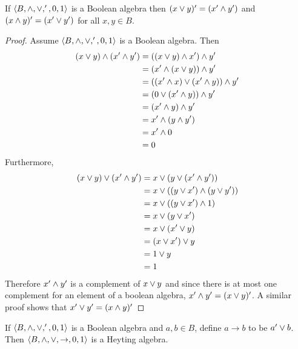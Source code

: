 \begin{theorem*}
If $\langle B, \wedge, \vee, ', 0 , 1\rangle$ is a Boolean algebra then $(x \vee y)' = (x' \wedge y')$ and $(x \wedge y)' = (x' \vee y')$ for all $x, y\in B$.
\end{theorem*}
\begin{proof}
Assume $\langle B, \wedge, \vee, ', 0 , 1\rangle$ is a Boolean algebra.
Then
\begin{align*}
(x\vee y) \wedge (x' \wedge y') &= ((x\vee y) \wedge x') \wedge y' \\
                               &= (x' \wedge  (x\vee y)) \wedge y' \\
                               &= ((x' \wedge x) \vee (x' \wedge y)) \wedge y' \\
                               &= (0 \vee (x' \wedge y)) \wedge y' \\
                               &= (x' \wedge y) \wedge y' \\
                               &= x' \wedge (y \wedge y') \\
                               &= x' \wedge 0 \\
                               &= 0 
\end{align*}
Furthermore,
\begin{align*}
(x\vee y) \vee (x' \wedge y') &= x\vee (y \vee (x' \wedge y')) \\
                               &= x\vee ((y \vee x') \wedge (y \vee y')) \\
                               &= x\vee ((y \vee x') \wedge 1) \\
                               &= x\vee (y \vee x') \\
                               &= x\vee (x' \vee y) \\
                               &= (x\vee x') \vee y \\
                               &= 1 \vee y \\
                               &= 1
\end{align*}
Therefore $x' \wedge y'$ is a complement of $x\vee y$ and since there is at most one complement for an element of a boolean algebra, $x' \wedge y' = (x\vee y)'$. A similar proof shows that $x' \vee y' = (x\wedge y)'$
\end{proof}

\begin{theorem*}
If $\langle B, \wedge, \vee, ', 0 , 1\rangle$ is a Boolean algebra and $a, b \in B$, define $a\to b$ to be $a'\vee b$.
Then $\langle B, \wedge, \vee, \to, 0, 1\rangle$ is a Heyting algebra.
\end{theorem*}

